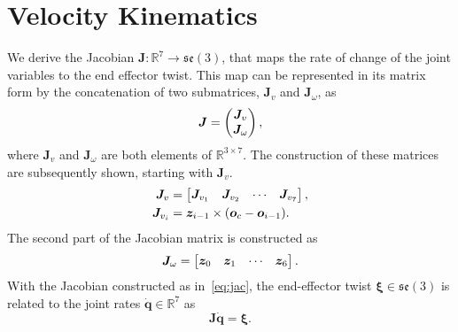 \section{Velocity Kinematics}
\label{sec:vel}

We derive the Jacobian $\bm{J}: \mathbb{R}^7 \rightarrow \mathfrak{se}(3)$, that
maps the rate of change of the joint variables to the end effector twist.
This map can be represented in its matrix form by the concatenation of two 
submatrices, $\bm{J}_v$ and $\bm{J}_\omega$, as 
\begin{equation} 
  \bm{J} = \begin{pmatrix}\bm{J}_v \\ \bm{J}_\omega\end{pmatrix}, 
  \label{eq:jac}
\end{equation}
where $\bm{J}_v$ and $\bm{J}_\omega$ are both elements of $\mathbb{R}^{3 \times
7}$. The construction of these matrices are subsequently shown, starting with 
$\bm{J}_v$.
%
\begin{align}
\begin{split}
  \bm{J}_v &= \begin{bmatrix}\bm{J}_{v_1} & \bm{J}_{v_2} & \cdots & \bm{J}_{v_7}\end{bmatrix}, \\
  \bm{J}_{v_i} &= \bm{z}_{i-1} \times (\bm{o}_c - \bm{o}_{i-1}).
  \label{eq:jac_v}
\end{split}
\end{align}
%
The second part of the Jacobian matrix is constructed as 
\begin{equation}
  \bm{J}_\omega = \begin{bmatrix}\bm{z}_0 & \bm{z}_1 & \cdots & \bm{z}_6\end{bmatrix}.
  \label{eq:jac_omega}
\end{equation}
%
With the Jacobian constructed as in~\eqref{eq:jac}, the end-effector 
twist $\bm{\xi} \in \mathfrak{se}(3)$ is related to the joint rates 
$\dot{\bm{q}} \in \mathbb{R}^7$ as \[ \bm{J} \dot{\bm{q}} = \bm{\xi}. \]
